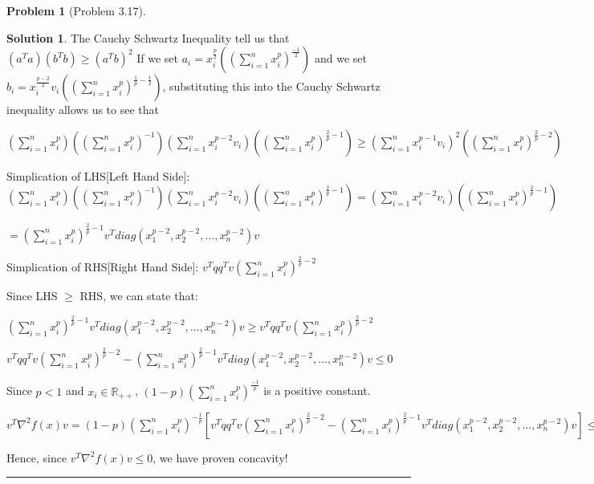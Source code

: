 \documentclass{article}
\theoremstyle{definition}
\newtheorem{problem}{Problem}
\def\fline{\rule{0.75\linewidth}{0.5pt}}
\newcommand{\finishline}{\begin{center}\fline\end{center}}
\newtheorem*{solution*}{Solution}
\newenvironment{solution}{\begin{solution*}}{{\finishline} \end{solution*}}
\begin{document}
\begin{problem} [Problem 3.17]
\begin{solution}
    The Cauchy Schwartz Inequality tell us that $(a^Ta) (b^Tb) \geq (a^Tb)^2$ \newline 
    If we set $a_i = x_i^{\frac{p}{2}} ((\sum_{i=1}^{n} x_i^p)^{\frac{-1}{2}})$ and we set $b_i = x_i^{\frac{p - 2}{2}} v_i ((\sum_{i=1}^{n} x_i^p)^{\frac{1}{p} - \frac{1}{2}})$, substituting this into the Cauchy Schwartz inequality allows us to see that 

    $(\sum_{i=1}^{n} x_i^p)  ((\sum_{i=1}^{n} x_i^p)^{-1}) (\sum_{i=1}^{n} x_i^{p - 2} v_i) ((\sum_{i=1}^{n} x_i^p)^{\frac{2}{p} - 1}) \geq (\sum_{i = 1}^{n} x_i^{p - 1} v_i )^2 ((\sum_{i=1}^{n} x_i^p)^{\frac{2}{p} - 2})$ \newline 

    Simplication of LHS[Left Hand Side]: \newline 
    $(\sum_{i=1}^{n} x_i^p)  ((\sum_{i=1}^{n} x_i^p)^{-1}) (\sum_{i=1}^{n} x_i^{p - 2} v_i) ((\sum_{i=1}^{n} x_i^p)^{\frac{2}{p} - 1}) = (\sum_{i=1}^{n} x_i^{p - 2} v_i) ((\sum_{i=1}^{n} x_i^p)^{\frac{2}{p} - 1})$ \newline 
    
    $= (\sum_{i=1}^{n} x_i^p)^{\frac{2}{p} - 1} v^T diag(x_1^{p - 2}, x_2^{p - 2}, \dots, x_n^{p - 2}) v$

    Simplication of RHS[Right Hand Side]: \newline 
    $v^Tqq^Tv (\sum_{i=1}^{n} x_i^p)^{\frac{2}{p} - 2}$

    Since LHS $\geq$ RHS, we can state that: \newline 

    $(\sum_{i=1}^{n} x_i^p)^{\frac{2}{p} - 1} v^T diag(x_1^{p - 2}, x_2^{p - 2}, \dots, x_n^{p - 2}) v \geq v^Tqq^Tv (\sum_{i=1}^{n} x_i^p)^{\frac{2}{p} - 2}$

    $v^Tqq^Tv (\sum_{i=1}^{n} x_i^p)^{\frac{2}{p} - 2} - (\sum_{i=1}^{n} x_i^p)^{\frac{2}{p} - 1} v^T diag(x_1^{p - 2}, x_2^{p - 2}, \dots, x_n^{p - 2}) v \leq 0$

    Since $p < 1$ and $x_i \in \mathbb{R}_{++}$, $(1 - p) (\sum_{i=1}^{n} x_i^p)^{\frac{-1}{p}}$ is a positive constant. \newline 

    $v^T \nabla^2f(x) v  = (1 - p) (\sum_{i=1}^{n} x_i^p)^{-\frac{1}{p}} [v^Tqq^Tv (\sum_{i=1}^{n} x_i^p)^{\frac{2}{p} - 2} - (\sum_{i=1}^{n} x_i^p)^{\frac{2}{p} - 1} v^T diag(x_1^{p - 2}, x_2^{p - 2}, \dots, x_n^{p - 2}) v] \leq 0$
    
    Hence, since $v^T \nabla^2f(x) v \leq 0$, we have proven concavity!
    
\end{solution}
\end{problem}
\end{document}
